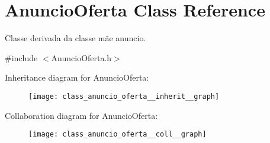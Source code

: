 \hypertarget{class_anuncio_oferta}{\section{Anuncio\+Oferta Class Reference}
\label{class_anuncio_oferta}
}


Classe derivada da classe mãe anuncio.  




{\ttfamily \#include $<$Anuncio\+Oferta.\+h$>$}



Inheritance diagram for Anuncio\+Oferta\+:\nopagebreak
\begin{figure}[H]
\begin{center}
\leavevmode
\texttt{[image: class\_anuncio\_oferta\_\_inherit\_\_graph]}
\end{center}
\end{figure}


Collaboration diagram for Anuncio\+Oferta\+:\nopagebreak
\begin{figure}[H]
\begin{center}
\leavevmode
\texttt{[image: class\_anuncio\_oferta\_\_coll\_\_graph]}
\end{center}
\end{figure}
